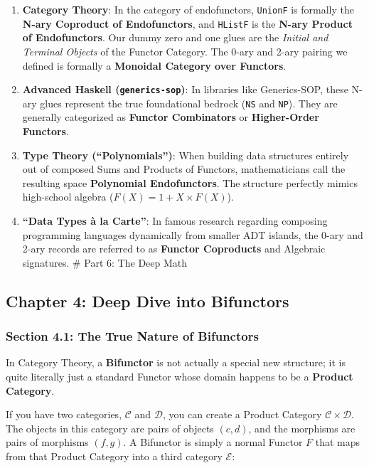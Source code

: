 \documentclass[
]{article}
\providecommand{\tightlist}{%
  \setlength{\itemsep}{0pt}\setlength{\parskip}{0pt}}
\begin{document}
\begin{enumerate}
\def\labelenumi{\arabic{enumi}.}
\tightlist
\item
  \textbf{Category Theory}: In the category of endofunctors,
  \texttt{UnionF} is formally the \textbf{N-ary Coproduct of
  Endofunctors}, and \texttt{HListF} is the \textbf{N-ary Product of
  Endofunctors}. Our dummy zero and one glues are the \emph{Initial and
  Terminal Objects} of the Functor Category. The 0-ary and 2-ary pairing
  we defined is formally a \textbf{Monoidal Category over Functors}.
\item
  \textbf{Advanced Haskell (\texttt{generics-sop})}: In libraries like
  Generics-SOP, these N-ary glues represent the true foundational
  bedrock (\texttt{NS} and \texttt{NP}). They are generally categorized
  as \textbf{Functor Combinators} or \textbf{Higher-Order Functors}.
\item
  \textbf{Type Theory (``Polynomials'')}: When building data structures
  entirely out of composed Sums and Products of Functors, mathematicians
  call the resulting space \textbf{Polynomial Endofunctors}. The
  structure perfectly mimics high-school algebra
  (\(F(X) = 1 + X \times F(X)\)).
\item
  \textbf{``Data Types à la Carte''}: In famous research regarding
  composing programming languages dynamically from smaller ADT islands,
  the 0-ary and 2-ary records are referred to as \textbf{Functor
  Coproducts} and Algebraic signatures. \# Part 6: The Deep Math
\end{enumerate}

\subsection{Chapter 4: Deep Dive into
Bifunctors}\label{chapter-4-deep-dive-into-bifunctors}

\subsubsection{Section 4.1: The True Nature of
Bifunctors}\label{section-4.1-the-true-nature-of-bifunctors}

In Category Theory, a \textbf{Bifunctor} is not actually a special new
structure; it is quite literally just a standard Functor whose domain
happens to be a \textbf{Product Category}.

If you have two categories, \(\mathcal{C}\) and \(\mathcal{D}\), you can
create a Product Category \(\mathcal{C} \times \mathcal{D}\). The
objects in this category are pairs of objects \((c, d)\), and the
morphisms are pairs of morphisms \((f, g)\). A Bifunctor is simply a
normal Functor \(F\) that maps from that Product Category into a third
category \(\mathcal{E}\):
\end{document}
